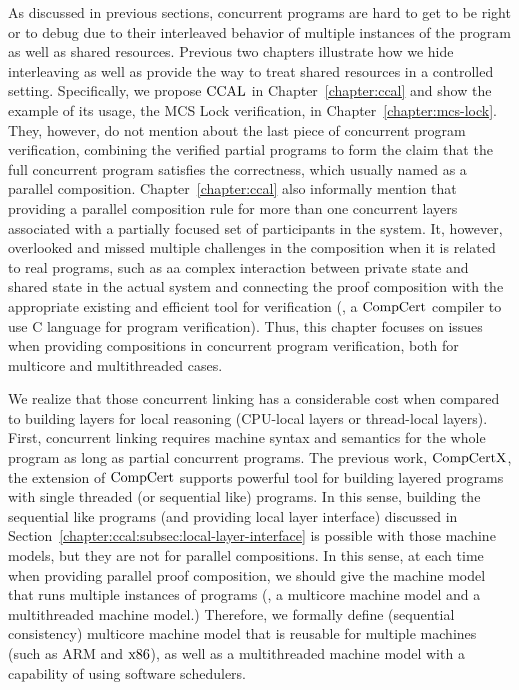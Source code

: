    

As discussed in previous sections,  concurrent programs are hard to get to be right or to debug due to their interleaved behavior of multiple instances of the program as well as shared resources. 
Previous two chapters illustrate how we hide interleaving as well as provide the way to treat shared resources in a controlled setting. 
Specifically, we propose  $\mathrm{CCAL}$ in Chapter~\ref{chapter:ccal} and show the example of its usage, the MCS Lock verification, in Chapter~\ref{chapter:mcs-lock}.
They, however, do not mention about the last piece of concurrent program verification, 
combining the verified partial programs to form the claim that the full concurrent program satisfies the correctness, 
which usually named as a parallel composition. 
Chapter~\ref{chapter:ccal} also informally mention that providing a  parallel composition rule for more than one
concurrent layers associated with a partially focused set of participants in the system. 
It, however, overlooked and missed multiple challenges in the composition when it is related to real programs,
such as aa complex interaction between private state and shared state in the actual system
and connecting the proof composition with the appropriate existing and efficient tool for verification (\ie, a $\mathrm{CompCert}$ compiler to use C language for program verification).
Thus, this chapter focuses on  issues when providing compositions in concurrent program verification,
both for multicore and multithreaded cases.

We realize that those concurrent linking has a considerable cost when compared to building layers for local reasoning (CPU-local layers or thread-local layers).
First, concurrent linking requires machine syntax and semantics 
for the whole program as long as partial concurrent programs.
The previous work, $\mathrm{CompCertX}$, the extension of $\mathrm{CompCert}$
supports powerful tool for building layered programs with single threaded (or sequential like) programs.
In this sense, 
building the sequential like programs (and providing local layer interface) discussed in Section~\ref{chapter:ccal:subsec:local-layer-interface} 
is possible with those machine models,
but they are not for parallel compositions. 
In this sense, at each time when providing parallel proof composition, 
we should give the machine model that runs multiple instances of programs (\ie, a multicore machine model and a multithreaded machine model.) 
Therefore, we  formally define (sequential consistency) multicore machine model that is reusable for multiple 
machines (such as ARM and $\mathrm{x86}$),  
as well as a multithreaded machine model with a capability of using software schedulers. 

